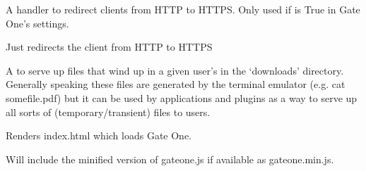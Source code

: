 \documentclass[letterpaper,10pt,openany]{sphinxmanual}
\begin{document}
\begin{fulllineitems}
\label{Developer/server:gateone.core.server.HTTPSRedirectHandler}
A handler to redirect clients from HTTP to HTTPS.  Only used if
 is True in Gate One's settings.

\begin{fulllineitems}
\label{Developer/server:gateone.core.server.HTTPSRedirectHandler.get}
Just redirects the client from HTTP to HTTPS

\end{fulllineitems}


\end{fulllineitems}


\begin{fulllineitems}
\label{Developer/server:gateone.core.server.DownloadHandler}
A  to serve up files that wind up in a
given user's  in the `downloads' directory.  Generally speaking
these files are generated by the terminal emulator (e.g. cat somefile.pdf)
but it can be used by applications and plugins as a way to serve up
all sorts of (temporary/transient) files to users.

\end{fulllineitems}


\begin{fulllineitems}
\label{Developer/server:gateone.core.server.MainHandler}
Renders index.html which loads Gate One.

Will include the minified version of gateone.js if available as
gateone.min.js.

\end{fulllineitems}

\end{document}

